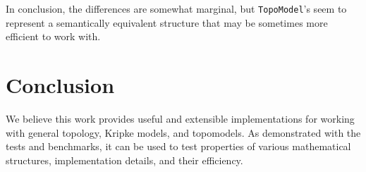 \documentclass[12pt,a4paper]{article}
\begin{document}
In conclusion, the differences are somewhat marginal, but \verb|TopoModel|'s seem to represent a semantically
equivalent structure that may be sometimes more efficient to work with.

\section{Conclusion}
We believe this work provides useful and extensible implementations for working with general topology, Kripke models, and topomodels. As demonstrated
with the tests and benchmarks, it can be used to test properties of various mathematical structures, implementation details,
and their efficiency.



\end{document}

